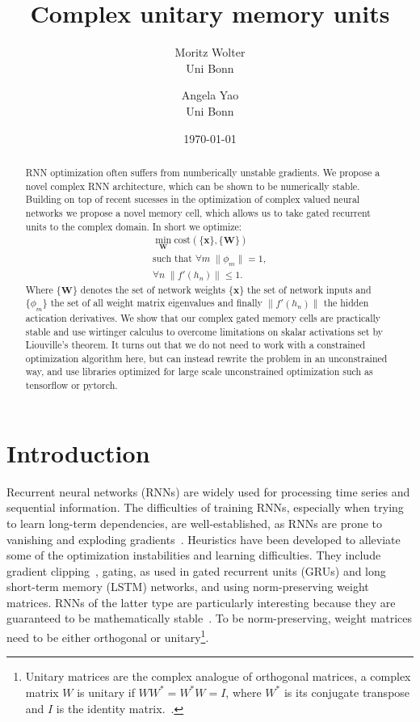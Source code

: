 \documentclass{article}
\title{Complex unitary memory units}
\author{Moritz Wolter  \\
    Uni Bonn  \\
    \and 
    Angela Yao \\
    Uni Bonn \\
    }
\date{\today}
\begin{document}

\maketitle

\begin{abstract}
RNN optimization often suffers from numberically unstable gradients. We propose a novel complex RNN architecture, which can be shown to be numerically stable. Building on top of recent sucesses in the optimization of complex valued neural networks we propose a novel memory cell, which allows us to take gated recurrent units to the complex domain. In short we optimize: 
\begin{align}
\min_{\mathbf{W}} \text{cost}(\{\mathbf{x}\}, \{\mathbf{W}\}) \\
\text{such that } \forall m \; \| \phi_m \| = 1, \\
                  \forall n \; \| f'(h_n) \| \leq 1.
\end{align}
Where $\{\mathbf{W}\}$ denotes the set of network weights $\{\mathbf{x}\}$ the set of network inputs and $\{\phi_m\}$ the set of all weight matrix eigenvalues and finally $\|f'(h_n) \|$ the hidden actication derivatives.
We show that our complex gated memory cells are practically stable and use wirtinger calculus to overcome limitations on skalar activations set by Liouville's theorem. It turns out that we do not need to work with a constrained optimization algorithm here, but can instead rewrite the problem in an unconstrained way, and use libraries optimized for large scale unconstrained optimization such as tensorflow or pytorch.
\end{abstract}

\section{Introduction}
Recurrent neural networks (RNNs) are widely used for processing time series and sequential information.  The difficulties of training RNNs, especially when trying to learn long-term dependencies, are well-established, as RNNs are prone to vanishing and exploding gradients~\cite{bengio1994learning,Hochreiter,Pascanu}.  
Heuristics have been developed to alleviate some of the optimization instabilities and learning difficulties.  They include gradient clipping~, gating, as used in gated recurrent units (GRUs) and long short-term memory (LSTM) networks, and using norm-preserving weight matrices. RNNs of the latter type are particularly interesting because they are guaranteed to be mathematically stable~\cite{Arjovsky}. To be norm-preserving, weight matrices need to be either orthogonal or unitary\footnote{Unitary matrices are the complex analogue of orthogonal matrices, \ie a complex matrix $W$ is unitary if $W W^* = W^* W = I$, where $W^*$ is its conjugate transpose and $I$ is the identity matrix.~.}.  
\end{document}
